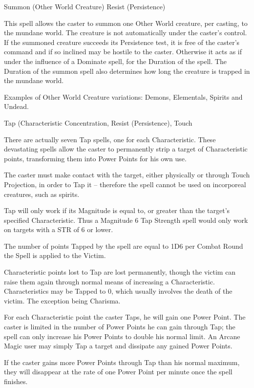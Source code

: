 \begin{samepage}
\begin{rpg-spell}
{Summon (Other World Creature)}
{Resist (Persistence)}

This spell allows the caster to summon one Other World creature, per casting, to the mundane world. The creature is not automatically under the caster’s control. If the summoned creature succeeds its Persistence test, it is free of the caster's command and if so inclined may be hostile to the caster. Otherwise it acts as if under the influence of a Dominate spell, for the Duration of the spell. The Duration of the summon spell also determines how long the creature is trapped in the mundane world.

Examples of Other World Creature variations: Demons, Elementals, Spirits and Undead.
\end{rpg-spell}
\end{samepage}


\begin{samepage}
\begin{rpg-spell}
{Tap (Characteristic}
{Concentration, Resist (Persistence), Touch}

There are actually seven Tap spells, one for each Characteristic. These devastating spells allow the caster to permanently strip a target of Characteristic points, transforming them into Power Points for his own use. 

The caster must make contact with the target, either physically or through Touch Projection, in order to Tap it – therefore the spell cannot be used on incorporeal creatures, such as spirits. 

Tap will only work if its Magnitude is equal to, or greater than the target’s specified Characteristic. Thus a Magnitude 6 Tap Strength spell would only work on targets with a STR of 6 or lower. 

The number of points Tapped by the spell are equal to 1D6 per Combat Round the Spell is applied to the Victim.

Characteristic points lost to Tap are lost permanently, though the victim can raise them again through normal means of increasing a Characteristic. Characteristics may be Tapped to 0, which usually involves the death of the victim. The exception being Charisma.

For each Characteristic point the caster Taps, he will gain one Power Point. The caster is limited in the number of Power Points he can gain through Tap; the spell can only increase his Power Points to double his normal limit. An Arcane Magic user may simply Tap a target and dissipate any gained Power Points. 

If the caster gains more Power Points through Tap than his normal maximum, they will disappear at the rate of one Power Point per minute once the spell finishes. 
\end{rpg-spell}
\end{samepage}


